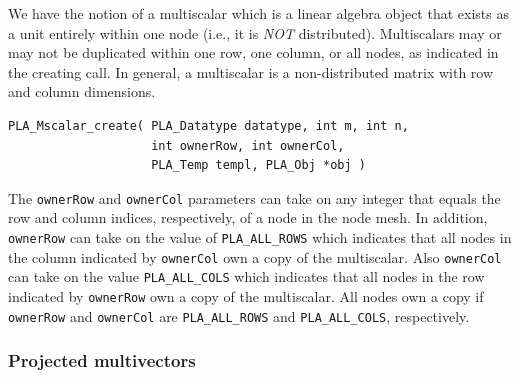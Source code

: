 We have the notion of a multiscalar which is a linear algebra object that exists as a unit
entirely within one node (i.e., it is {\em NOT} distributed).  Multiscalars may or may not be
duplicated within one row, one column, or all nodes, as indicated in the creating call.  
In general, a multiscalar is a non-distributed matrix with row and column dimensions.
\begin{FlaSpec}
\begin{verbatim}
PLA_Mscalar_create( PLA_Datatype datatype, int m, int n,
                    int ownerRow, int ownerCol,
                    PLA_Temp templ, PLA_Obj *obj )
\end{verbatim}
\end{FlaSpec}
The {\tt ownerRow} and {\tt ownerCol} parameters can take on any integer that equals
the row and column indices, respectively, of a node in the node mesh.  In addition,
{\tt ownerRow} can take on the value of {\tt PLA\_ALL\_ROWS} which indicates that all
nodes in the column indicated by {\tt ownerCol} own a copy of the multiscalar.
Also {\tt ownerCol} can take on the value {\tt PLA\_ALL\_COLS} which indicates
that all nodes in the row indicated by {\tt ownerRow} own a copy of the multiscalar.
All nodes own a copy if {\tt ownerRow} and {\tt ownerCol} are
{\tt PLA\_ALL\_ROWS} and {\tt PLA\_ALL\_COLS}, respectively.


\subsubsection{Projected multivectors}

